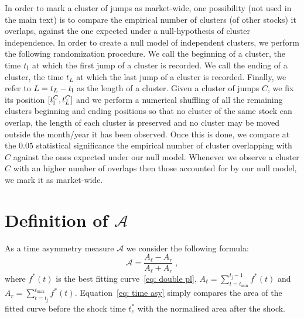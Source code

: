 \documentclass[amsmath,amssymb,aps,pre,floatfix,twocolumn,superscriptaddress]{revtex4}
\begin{document}
In order to mark a cluster of jumps as market-wide, one possibility (not used in the main text) is to compare the empirical number of clusters (of other stocks) it overlaps, against the one expected under a null-hypothesis of cluster independence. In order to create a null model of independent clusters, we perform the following randomization procedure. We call the beginning of a cluster, the time $t_{\text l}$ at which the first jump of a cluster is recorded. We call the ending of a cluster, the time $t_{L}$ at which the last jump of a cluster is recorded. Finally, we refer to $L=t_{L}-t_{\text l}$ as the length of a cluster. Given a cluster of jumps $C$, we fix its position $[t^C_{\text l},t^C_{L}]$ and we perform a numerical shuffling of all the remaining clusters beginning and ending positions so that no cluster of the same stock can overlap, the length of each cluster is preserved and no cluster may be moved outside the month/year it has been observed. Once this is done, we compare at the $0.05$ statistical significance the empirical number of cluster overlapping with $C$ against the ones expected under our null model. Whenever we observe a cluster $C$ with an higher number of overlaps then those accounted for by our null model, we mark it as market-wide.

\section{Definition of $\mathcal{A}$}

As a time asymmetry measure $\mathcal{A}$ we consider the following formula:
\begin{equation}\label{eq: time asy}
\mathcal{A} = \frac{ A_{\ell}-A_r }{A_{\ell}+A_r} \; ,    
\end{equation}
where $f^*(t)$ is the best fitting curve~\ref{eq: double pl}, $A_{\ell} = \sum_{t=t_{\text{min}}}^{t_{\text{j}}-1} f^*(t)$ and $A_r = \sum_{t=t_{\text{j}}}^{t_{\text{max}}} f^*(t)$. Equation~\ref{eq: time asy} simply compares the area of the fitted curve before the shock time $t_c^*$ with the normalised area after the shock.
\end{document}

